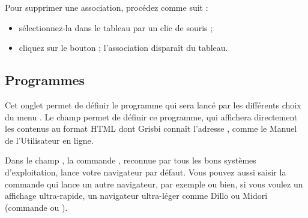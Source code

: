 \ifIllustration
\fi 
 
Pour supprimer une association, procédez comme suit :
\begin{itemize}
	\item sélectionnez-la dans le tableau par un clic de souris ;
	\item cliquez sur le bouton  ; l'association disparaît du tableau.
\end{itemize}


\subsection{Programmes\label{setup-general-programs}}

Cet onglet permet de définir le programme qui sera lancé par les différents choix du menu . Le champ  permet de définir ce programme, qui affichera directement les contenus au format \gls{HTML} dont Grisbi connaît l'adresse  , comme le Manuel de l'Utilisateur en ligne.

\ifIllustration
\pichskip{7mm}
\label{setup-programs-img}
\fi

\noindent  Dans le champ , la commande , reconnue par tous les bons systèmes d'exploitation, lance votre navigateur par défaut. Vous pouvez aussi saisir la commande qui lance un autre navigateur, par exemple \newlinepdf {} ou bien, si vous voulez un affichage ultra-rapide, un navigateur ultra-léger comme Dillo ou Midori (commande  ou ).

